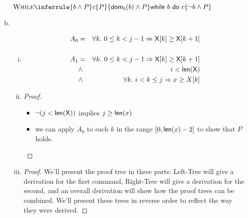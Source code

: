 \begin{enumerate}[(a)]
$\Rule{While}{
    \{ b \wedge P \}
    c
    \{ P \}
}{
    \{ \dom_b(b) \wedge P \}
    \whilestmt{b}{c}
    \{ \neg b \wedge P \}
}$

\item
\begin{enumerate}[i.]
    \item
    \begin{eqnarray*}
        A_0 & = & \forall k .~0 \leq k < j - 1 \Rightarrow  {\sf X}[k] \geq {\sf X}[k + 1] \\
              & & \\
        A_1 & = & \forall k.~0 \leq k < j - 1 \Rightarrow \textsf{X}[k] \geq \textsf{X}[k + 1] \\
              & \wedge     & i < \textsf{len}(\textsf{X}) \\
              & \wedge     & \forall k .~i < k \leq j \Rightarrow  x \geq X[k]
    \end{eqnarray*}

    \item
    \begin{proof} \hspace{1cm} \\
        \begin{itemize}
        \item $\neg (j < {\sf len(X)})$ implies $j \geq {\sf len}(x)$
        \item we can apply $A_0$ to each $k$ in the range
        $[0, {\sf len}(x) - 2]$ to show that $P$ holds.
        \end{itemize}
    \end{proof}

    \item
    \begin{proof} We'll present the proof tree in three parts: Left-Tree will
        give a derivation for the first command, Right-Tree will give a
        derivation for the second, and an overall derivation will
        show how the proof trees can be combined. We'll present these trees
        in reverse order to reflect the way they were derived.

        \newcommand{\leftPremise}{
            \{ \dom_a(i + 1) \wedge \dom_a({\sf X}[i])
               \wedge A_1[i - 1 / i][\X[i + 1 \mapsto \X[i]]
             \}
             ~\X[i + 1] = \X[i]~
             \{ A_1[i - 1/ i] \}
        }

        \newcommand{\leftBase}{
            \{ A_1 \wedge ((i \geq 0) \wedge {\sf X}[i] < x) \}
            ~\X[i + 1] = \X[i]~
            \{ A_1[i - 1/ i] \}
        }


\end{proof}
\end{enumerate}
\end{enumerate}

